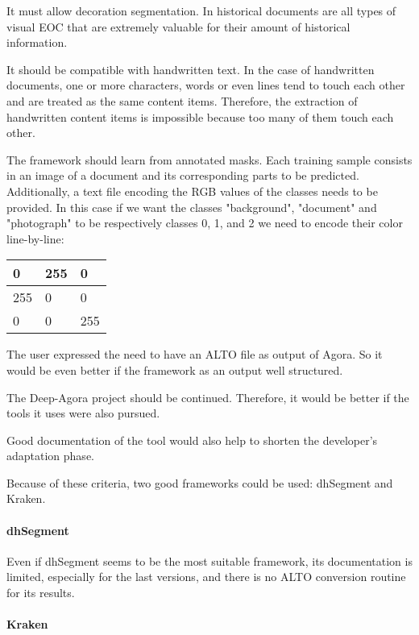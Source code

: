 \documentclass{polytech/polytech}
\numberwithin{figure}{chapter}
\begin{document}
It must allow decoration segmentation.
In historical documents are all types of visual EOC that are extremely valuable for their amount of historical information.

It should be compatible with handwritten text.
In the case of handwritten documents, one or more characters, words or even lines tend to touch each other and are treated as the same content items.
Therefore, the extraction of handwritten content items is impossible because too many of them touch each other.

The framework should learn from annotated masks.
Each training sample consists in an image of a document and its corresponding parts to be predicted.
Additionally, a text file encoding the RGB values of the classes needs to be provided.
In this case if we want the classes "background", "document" and "photograph" to be respectively classes 0, 1, and 2 we need to encode their color line-by-line:
\begin{table}[]
\begin{tabular}{|lll|}\hline
0 & 255 & 0 \\\hline
255 & 0 & 0 \\\hline
0 & 0  &255 \\\hline
\end{tabular}
\end{table}

The user expressed the need to have an ALTO file as output of Agora.
So it would be even better if the framework as an output well structured.

The Deep-Agora project should be continued.
Therefore, it would be better if the tools it uses were also pursued.

Good documentation of the tool would also help to shorten the developer's adaptation phase.

Because of these criteria, two good frameworks could be used: dhSegment and Kraken.

\paragraph{dhSegment}

Even if dhSegment seems to be the most suitable framework, its documentation is limited, especially for the last versions, and there is no ALTO conversion routine for its results.

\paragraph{Kraken}
\end{document}
